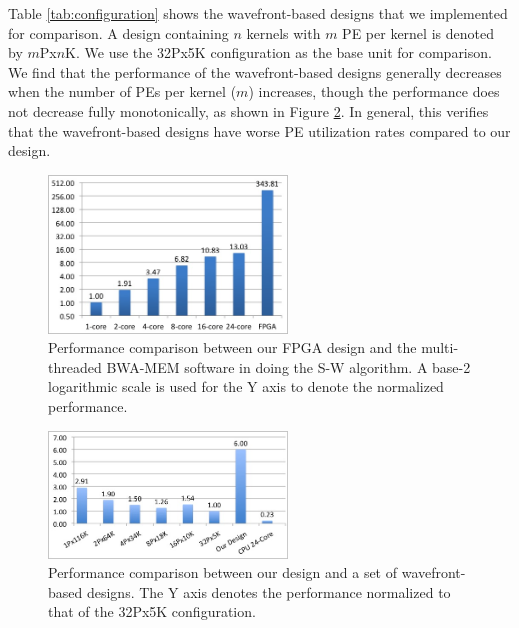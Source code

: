 Table \ref{tab:configuration} shows the wavefront-based designs that we implemented for comparison. 
A design containing $n$ kernels with $m$ PE per kernel is denoted by $m$Px$n$K. 
We use the 32Px5K configuration as the base unit for comparison.
We find that the performance of the wavefront-based designs generally decreases when the number of PEs per kernel ($m$) increases, though the performance does not decrease fully monotonically, as shown in Figure \ref{fig:F2C5}.
In general, this verifies that the wavefront-based designs have worse PE utilization rates compared to our design. 

\begin{figure}[!hbt]
	\begin{center}
		\includegraphics[width=2.5in]{Figures/F1C5.jpg}
		\caption {Performance comparison between our FPGA design and the multi-threaded BWA-MEM software in doing the S-W algorithm. A base-2 logarithmic scale is used for the Y axis to denote the normalized performance.}
		\label{fig:F1C5}
	\end{center}
\end{figure}
\vspace{-20pt}

\begin{figure}[!hbt]
	\begin{center}
		\includegraphics[width=2.5in]{Figures/F2C5.jpg}
		\caption {Performance comparison between our design and a set of wavefront-based designs. The Y axis denotes the performance normalized to that of the 32Px5K configuration.}
		\label{fig:F2C5}
	\end{center}
\end{figure}
\vspace{-10pt}

